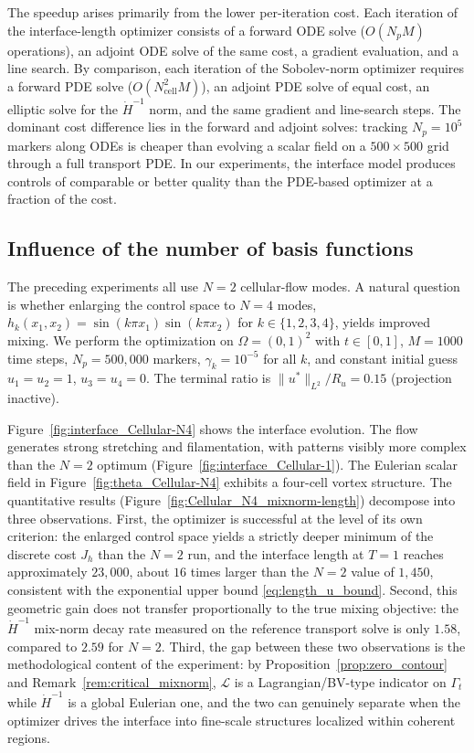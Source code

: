 \documentclass[12pt, reqno]{amsart}
\theoremstyle{plain}
\theoremstyle{definition}
\numberwithin{equation}{section}
\numberwithin{figure}{section}
\numberwithin{algorithm}{section}
\begin{document}
The speedup arises primarily from the lower per-iteration cost. Each iteration of the interface-length optimizer consists of a forward ODE solve ($O(N_p M)$ operations), an adjoint ODE solve of the same cost, a gradient evaluation, and a line search. By comparison, each iteration of the Sobolev-norm optimizer requires a forward PDE solve ($O(N_{\mathrm{cell}}^2 M)$), an adjoint PDE solve of equal cost, an elliptic solve for the $\dot{H}^{-1}$ norm, and the same gradient and line-search steps. The dominant cost difference lies in the forward and adjoint solves: tracking $N_p = 10^5$ markers along ODEs is cheaper than evolving a scalar field on a $500 \times 500$ grid through a full transport PDE. In our experiments, the interface model produces controls of comparable or better quality than the PDE-based optimizer at a fraction of the cost.


\subsection{Influence of the number of basis functions}\label{sec:N4}

The preceding experiments all use $N=2$ cellular-flow modes. A natural question is whether enlarging the control space to $N=4$ modes, $h_k(x_1,x_2)=\sin(k\pi x_1)\sin(k\pi x_2)$ for $k\in\{1,2,3,4\}$, yields improved mixing. We perform the optimization on $\Omega=(0,1)^2$ with $t\in[0,1]$, $M=1000$ time steps, $N_p=500{,}000$ markers, $\gamma_k=10^{-5}$ for all $k$, and constant initial guess $u_1=u_2=1$, $u_3=u_4=0$. The terminal ratio is $\|u^*\|_{L^2}/R_u = 0.15$ (projection inactive).

Figure~\ref{fig:interface_Cellular-N4} shows the interface evolution. The flow generates strong stretching and filamentation, with patterns visibly more complex than the $N=2$ optimum (Figure~\ref{fig:interface_Cellular-1}). The Eulerian scalar field in Figure~\ref{fig:theta_Cellular-N4} exhibits a four-cell vortex structure. The quantitative results (Figure~\ref{fig:Cellular_N4_mixnorm-length}) decompose into three observations. First, the optimizer is successful at the level of its own criterion: the enlarged control space yields a strictly deeper minimum of the discrete cost $J_h$ than the $N=2$ run, and the interface length at $T=1$ reaches approximately $23{,}000$, about $16$ times larger than the $N=2$ value of $1{,}450$, consistent with the exponential upper bound \eqref{eq:length_u_bound}. Second, this geometric gain does not transfer proportionally to the true mixing objective: the $\dot{H}^{-1}$ mix-norm decay rate measured on the reference transport solve is only $1.58$, compared to $2.59$ for $N=2$. Third, the gap between these two observations is the methodological content of the experiment: by Proposition~\ref{prop:zero_contour} and Remark~\ref{rem:critical_mixnorm}, $\mathcal L$ is a Lagrangian/BV-type indicator on $\Gamma_t$ while $\dot{H}^{-1}$ is a global Eulerian one, and the two can genuinely separate when the optimizer drives the interface into fine-scale structures localized within coherent regions.
\end{document}

